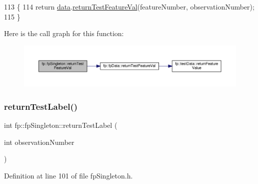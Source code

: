 \begin{DoxyCode}
113                                                                                                     \{
114                 \textcolor{keywordflow}{return} \hyperlink{classfp_1_1fpSingleton_a2fa16ac6a0f66641749032eeee61b8e9}{data}.\hyperlink{classfp_1_1fpData_a42f76961f1649e329d654e9e1bb13fc6}{returnTestFeatureVal}(featureNumber, observationNumber);
115             \}
\end{DoxyCode}
Here is the call graph for this function\+:
\nopagebreak
\begin{figure}[H]
\begin{center}
\leavevmode
\includegraphics[width=350pt]{classfp_1_1fpSingleton_ad74b421d65b17ba924244bff31fc9db6_cgraph}
\end{center}
\end{figure}
\mbox{\label{classfp_1_1fpSingleton_ac0d2a2fd5ed471c8d507dfd544c12e6d}} 
\subsubsection{\texorpdfstring{return\+Test\+Label()}{returnTestLabel()}}
{\footnotesize\ttfamily int fp\+::fp\+Singleton\+::return\+Test\+Label (\begin{DoxyParamCaption}\item[{int}]{observation\+Number }\end{DoxyParamCaption})\hspace{0.3cm}{\ttfamily [inline]}}



Definition at line 101 of file fp\+Singleton.\+h.


